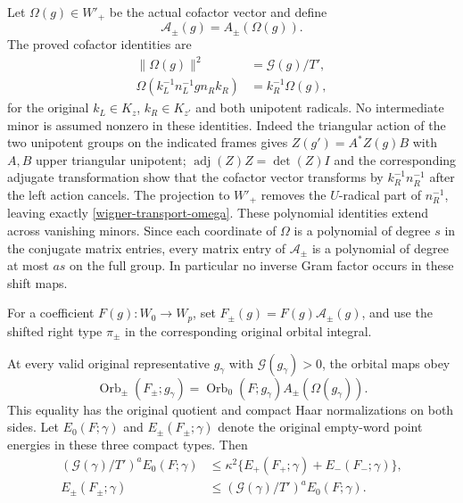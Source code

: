 Let $\Omega(g)\in W'_+$ be the actual cofactor vector and define
\[
              \mathcal A_\pm(g)=A_\pm(\Omega(g)).
\]
The proved cofactor identities are
\begin{align}
 \|\Omega(g)\|^2&=\mathcal G(g)/T',\label{wigner-transport-gram}\\
 \Omega(k_L^{-1}n_L^{-1}g n_Rk_R)&=k_R^{-1}\Omega(g),
                                                        \label{wigner-transport-omega}
\end{align}
for the original $k_L\in K_z$, $k_R\in K_{z'}$ and both
unipotent radicals.  No intermediate minor is assumed nonzero
in these identities.  Indeed the triangular action of the two
unipotent groups on the indicated frames gives
$Z(g')=A^*Z(g)B$ with $A,B$ upper triangular unipotent;
$\operatorname{adj}(Z)Z=\det(Z)I$ and the corresponding
adjugate transformation show that the cofactor vector transforms
by $k_R^{-1}n_R^{-1}$ after the left action cancels.
The projection to $W'_+$ removes the $U$-radical part of
$n_R^{-1}$, leaving exactly
\eqref{wigner-transport-omega}.  These polynomial identities
extend across vanishing minors.  Since each coordinate of $\Omega$ is a
polynomial of degree $s$ in the conjugate matrix entries,
every matrix entry of $\mathcal A_\pm$ is a polynomial of
degree at most $as$ on the full group.  In particular no inverse
Gram factor occurs in these shift maps.

For a coefficient $F(g):W_0\to W_p$, set
$F_\pm(g)=F(g)\mathcal A_\pm(g)$, and use the shifted right
type $\pi_\pm$ in the corresponding original orbital integral.

\begin{proposition}\label{wigner-transport-orbital}
At every valid original representative $g_\gamma$ with
$\mathcal G(g_\gamma)>0$, the orbital maps obey
\begin{equation}\label{wigner-transport-orbital-factor}
 \operatorname{Orb}_\pm(F_\pm;g_\gamma)
       =\operatorname{Orb}_0(F;g_\gamma)
                         A_\pm(\Omega(g_\gamma)).
\end{equation}
This equality has the original quotient and compact Haar
normalizations on both sides.  Let $E_0(F;\gamma)$ and
$E_\pm(F_\pm;\gamma)$ denote the original empty-word point
energies in these three compact types.  Then
\begin{align}
 (\mathcal G(\gamma)/T')^a E_0(F;\gamma)
 &\le\kappa^2\{E_+(F_+;\gamma)+E_-(F_-;\gamma)\},
                                                        \label{wigner-transport-point-lower}\\
 E_\pm(F_\pm;\gamma)
 &\le(\mathcal G(\gamma)/T')^a E_0(F;\gamma).
                                                        \label{wigner-transport-point-upper}
\end{align}
\end{proposition}

